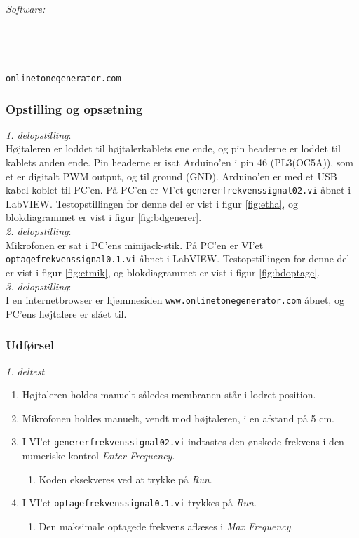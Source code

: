 		\textit{Software:}\\
		\labview\\
		\visa\\
		\vi\\
		\ardsw\\
		\texttt{onlinetonegenerator.com}
		
		\subsubsection{Opstilling og opsætning}
		\textit{1. delopstilling}:\\
		Højtaleren er loddet til højtalerkablets ene ende, og pin headerne er loddet til kablets anden ende. 
		Pin headerne er isat Arduino'en i pin 46 (PL3(OC5A)), som et er digitalt PWM output, og til ground (GND). 
		Arduino'en er med et USB kabel koblet til PC'en. 		
		På PC'en er VI'et \texttt{genererfrekvenssignal02.vi} åbnet i LabVIEW. Testopstillingen for denne del er vist i figur \ref{fig:etha}, og blokdiagrammet er vist i figur \ref{fig:bdgenerer}.\\ 
 
		\textit{2. delopstilling}:\\
		Mikrofonen er sat i PC'ens minijack-stik. På PC'en er VI'et \texttt{optagefrekvenssignal0.1.vi} åbnet i LabVIEW. Testopstillingen for denne del er vist i figur \ref{fig:etmik}, og blokdiagrammet er vist i figur \ref{fig:bdoptage}.\\  
		
		\textit{3. delopstilling}:\\
		I en internetbrowser er hjemmesiden \texttt{www.onlinetonegenerator.com} åbnet, og PC'ens højtalere er slået til. 
		
		\subsubsection{Udførsel}
			
			\textit{1. deltest}
			\begin{enumerate}
				\item Højtaleren holdes manuelt således membranen står i lodret position. 
				\item Mikrofonen holdes manuelt, vendt mod højtaleren, i en afstand på 5 cm. 
				\item I VI'et \texttt{genererfrekvenssignal02.vi} indtastes den ønskede frekvens i den numeriske kontrol \textit{Enter Frequency}. 
					\begin{enumerate}
						\item Koden eksekveres ved at trykke på \textit{Run}. 
					\end{enumerate} 
				\item I VI'et \texttt{optagefrekvenssignal0.1.vi} trykkes på \textit{Run}. 
					\begin{enumerate}
						\item Den maksimale optagede frekvens aflæses i \textit{Max Frequency}. 
					\end{enumerate}	 	
			\end{enumerate}
			
